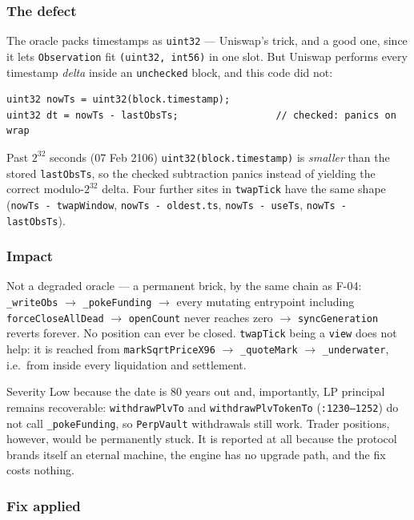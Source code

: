 \documentclass[11pt,a4paper]{article}
\newcommand{\code}[1]{\texttt{\small #1}}
\newcommand{\fileref}[1]{\texttt{\scriptsize #1}}
\begin{document}
\subsubsection*{The defect}

The oracle packs timestamps as \code{uint32} --- Uniswap's trick, and a good one,
since it lets \code{Observation} fit \code{(uint32, int56)} in one slot. But
Uniswap performs every timestamp \emph{delta} inside an \code{unchecked} block, and
this code did not:
\begin{lstlisting}
uint32 nowTs = uint32(block.timestamp);
uint32 dt = nowTs - lastObsTs;                 // checked: panics on wrap
\end{lstlisting}

Past $2^{32}$ seconds (07 Feb 2106) \code{uint32(block.timestamp)} is
\emph{smaller} than the stored \code{lastObsTs}, so the checked subtraction panics
instead of yielding the correct modulo-$2^{32}$ delta. Four further sites in
\code{twapTick} have the same shape (\code{nowTs - twapWindow},
\code{nowTs - oldest.ts}, \code{nowTs - useTs}, \code{nowTs - lastObsTs}).

\subsubsection*{Impact}

Not a degraded oracle --- a permanent brick, by the same chain as F-04:
\code{\_writeObs} $\rightarrow$ \code{\_pokeFunding} $\rightarrow$ every mutating
entrypoint including \code{forceCloseAllDead} $\rightarrow$ \code{openCount} never
reaches zero $\rightarrow$ \code{syncGeneration} reverts forever. No position can
ever be closed. \code{twapTick} being a \code{view} does not help: it is reached
from \code{markSqrtPriceX96} $\rightarrow$ \code{\_quoteMark} $\rightarrow$
\code{\_underwater}, i.e.\ from inside every liquidation and settlement.

Severity Low because the date is 80 years out and, importantly, LP principal
remains recoverable: \code{withdrawPlvTo} and \code{withdrawPlvTokenTo}
(\fileref{:1230--1252}) do not call \code{\_pokeFunding}, so \code{PerpVault}
withdrawals still work. Trader positions, however, would be permanently stuck. It
is reported at all because the protocol brands itself an eternal machine, the
engine has no upgrade path, and the fix costs nothing.

\subsubsection*{Fix applied}
\end{document}
